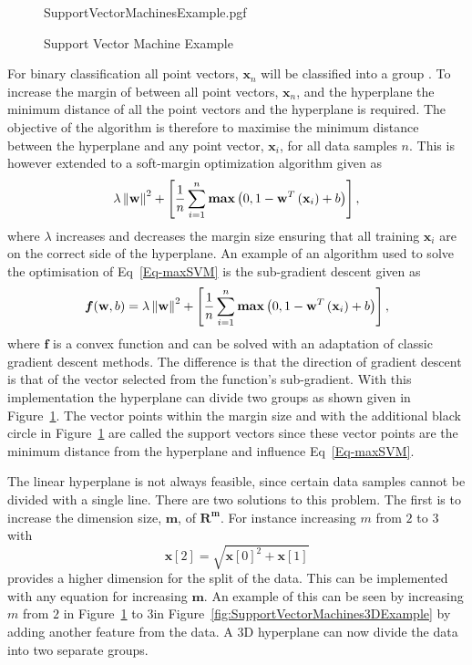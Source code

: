 \begin{figure}[!hbt]
	\centering
	{SupportVectorMachinesExample.pgf}
	\caption{Support Vector Machine Example}
	\label{fig:SupportVectorMachinesExample}
\end{figure}

For binary classification all point vectors, $\mathbf{x}_n$ will be classified into a group  . To increase the margin of between all point vectors, $\mathbf{x}_n$, and the hyperplane the minimum distance of all the point vectors and the hyperplane is required. The objective of the algorithm is therefore to maximise the minimum distance between the hyperplane and any point vector, $\mathbf{x}_i$, for all data samples $n$. This is however extended to a soft-margin optimization algorithm given as
\begin{equation}
\label{Eq-maxSVM}
\lambda \left\lVert\mathbf{w}\right\rVert^2 + \left[\frac{1}{n} \sum_{i=1}^{n} \textbf{max} \left(0, 1 - \mathbf{w}^T\left(\mathbf{x}_i \right) + b \right) \right],
\end{equation}
where $\lambda$ increases and decreases the margin size ensuring that all training $\mathbf{x}_i$ are on the correct side of the hyperplane. An example of an algorithm used to solve the optimisation of Eq~\ref{Eq-maxSVM} is the sub-gradient descent given as
\begin{equation}
\boldsymbol{f}(\mathbf{w}, b) = \lambda \left\lVert\mathbf{w}\right\rVert^2 + \left[\frac{1}{n} \sum_{i=1}^{n} \textbf{max} \left(0, 1 - \mathbf{w}^T\left(\mathbf{x}_i\right) + b \right) \right],
\end{equation}
where $\boldsymbol{f}$ is a convex function and can be solved with an adaptation of classic gradient descent methods. The difference is that the direction of gradient descent is that of the vector selected from the function's sub-gradient. With this implementation the hyperplane can divide two groups as shown given in Figure~\ref{fig:SupportVectorMachinesExample}. The vector points within the margin size and with the additional black circle in Figure~\ref{fig:SupportVectorMachinesExample} are called the support vectors since these vector points are the minimum distance from the hyperplane and influence Eq~\ref{Eq-maxSVM}.

The linear hyperplane is not always feasible, since certain data samples cannot be divided with a single line. There are two solutions to this problem. The first is to increase the dimension size, $\mathbf{m}$, of $\mathbf{R^m}$. For instance increasing $m$ from $2$ to $3$ with 
\begin{equation}
\mathbf{x}[2] = \sqrt{\mathbf{x}[0]^2 + \mathbf{x}[1]}
\end{equation}
provides a higher dimension for the split of the data. This can be implemented with any equation for increasing $\mathbf{m}$. An example of this can be seen by increasing $m$ from $2$ in Figure~\ref{fig:SupportVectorMachinesExample} to $3$in Figure~\ref{fig:SupportVectorMachines3DExample} by adding another feature from the data. A $3$D hyperplane can now divide the data into two separate groups.

